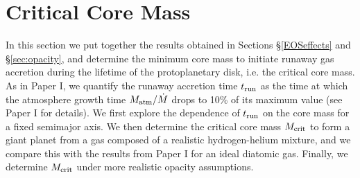 \documentclass[apj]{emulateapj}
\begin{document}


\section{Critical Core Mass}
\label{critical}




In this section we put together the results obtained in Sections \S\ref{EOSeffects}  and \S\ref{sec:opacity}, and determine the minimum core mass to initiate runaway gas accretion during the lifetime of the protoplanetary disk, i.e. the critical core mass. As in Paper I, we quantify the runaway accretion time $t_{\rm run}$ as the time at which the atmosphere growth time $M_{\rm atm}/\dot{M}$ drops to 10\% of its maximum value (see Paper I for details). We first explore the dependence of $t_{\rm run}$ on the core mass for a fixed semimajor axis. We then determine the critical core mass $M_{\rm crit}$ to form a giant planet from a gas composed of a realistic hydrogen-helium mixture, and we compare this with the results from Paper I for an ideal diatomic gas. Finally, we determine $M_{\rm crit}$ under more realistic opacity assumptions.

\end{document}
